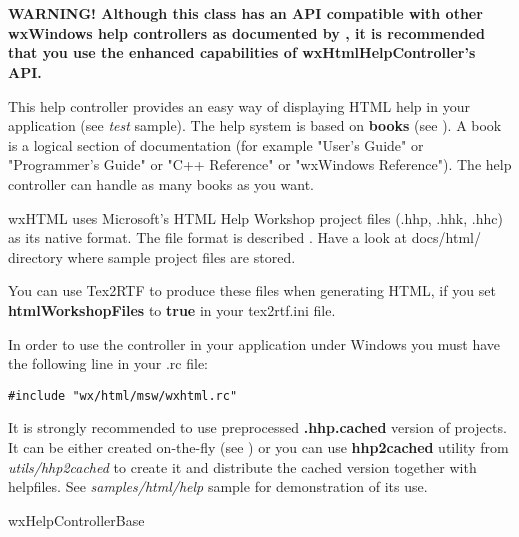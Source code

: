 %
%

\section{}\label{wxhtmlhelpcontroller}

{\bf WARNING! Although this class has an API compatible with other wxWindows
help controllers as documented by , it
is recommended that you use the enhanced capabilities of wxHtmlHelpController's API.}

This help controller provides an easy way of displaying HTML help in your
application (see {\it test} sample). The help system is based on {\bf books} 
(see ). A book is a logical
section of documentation (for example "User's Guide" or "Programmer's Guide" or
"C++ Reference" or "wxWindows Reference"). The help controller can handle as
many books as you want.

wxHTML uses Microsoft's HTML Help Workshop project files (.hhp, .hhk, .hhc) as its
native format. The file format is described .
Have a look at docs/html/ directory where sample project files are stored.

You can use Tex2RTF to produce these files when generating HTML, if you set {\bf htmlWorkshopFiles} to {\bf true} in
your tex2rtf.ini file.

In order to use the controller in your application under Windows you must
have the following line in your .rc file:

\begin{verbatim}
#include "wx/html/msw/wxhtml.rc"
\end{verbatim}


It is strongly recommended to use preprocessed {\bf .hhp.cached} version of
projects. It can be either created on-the-fly (see 
) or you can use 
{\bf hhp2cached} utility from {\it utils/hhp2cached} to create it and
distribute the cached version together with helpfiles. See {\it samples/html/help} 
sample for demonstration of its use.


wxHelpControllerBase


